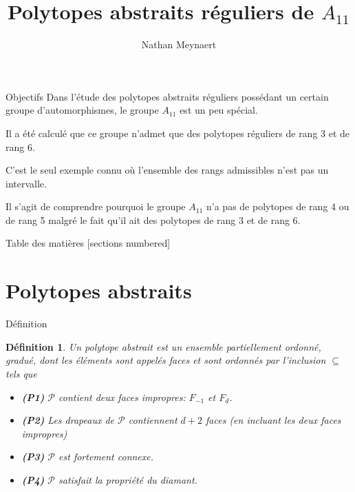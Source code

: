 \documentclass[10pt]{beamer}
\title{Polytopes abstraits réguliers de $A_{11}$}
\date{}
\author{Nathan Meynaert}
\newtheorem{definition}{Définition}[section]
\begin{document}
\maketitle

\begin{frame}{Objectifs}
  Dans l'étude des polytopes abstraits réguliers possédant un certain groupe d'automorphismes, le groupe $A_{11}$ est un peu spécial.

  Il a été calculé que ce groupe n'admet que des polytopes réguliers de rang 3 et de rang 6.

  C'est le seul exemple connu où l'ensemble des rangs admissibles n'est pas un intervalle.

  Il s'agit de comprendre pourquoi le groupe $A_{11}$ n'a pas de polytopes de rang 4 ou de rang 5 malgré le fait qu'il ait des polytopes de rang 3 et de rang 6.
\end{frame}

\begin{frame}{Table des matières}
  [sections numbered]
  \tableofcontents[hideallsubsections]
\end{frame}

\section{Polytopes abstraits}

\begin{frame}{Définition}

  \begin{definition}
    Un \textit{polytope abstrait} est un ensemble partiellement ordonné, gradué,  dont les éléments sont appelés \textit{faces} et sont ordonnés par l'inclusion $\subseteq$ tels que
    \begin{itemize}
      \item \textbf{(P1)} $\mathcal P$ contient deux faces impropres: $F_{-1}$ et $F_d$.
      \item \textbf{(P2)} Les drapeaux de $\mathcal P$ contiennent $d+2$ faces (en incluant les deux faces impropres)    \item \textbf{(P3)} $\mathcal P$ est fortement connexe.
      \item \textbf{(P4)} $\mathcal P$ satisfait la propriété du diamant.
    \end{itemize}
  \end{definition}

\end{frame}
\end{document}
